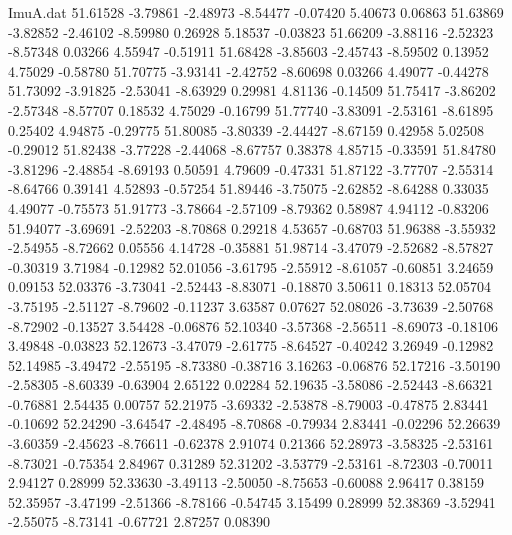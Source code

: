 \begin{filecontents}{ImuA.dat}
  51.61528   -3.79861   -2.48973   -8.54477   -0.07420    5.40673    0.06863
  51.63869   -3.82852   -2.46102   -8.59980    0.26928    5.18537   -0.03823
  51.66209   -3.88116   -2.52323   -8.57348    0.03266    4.55947   -0.51911
  51.68428   -3.85603   -2.45743   -8.59502    0.13952    4.75029   -0.58780
  51.70775   -3.93141   -2.42752   -8.60698    0.03266    4.49077   -0.44278
  51.73092   -3.91825   -2.53041   -8.63929    0.29981    4.81136   -0.14509
  51.75417   -3.86202   -2.57348   -8.57707    0.18532    4.75029   -0.16799
  51.77740   -3.83091   -2.53161   -8.61895    0.25402    4.94875   -0.29775
  51.80085   -3.80339   -2.44427   -8.67159    0.42958    5.02508   -0.29012
  51.82438   -3.77228   -2.44068   -8.67757    0.38378    4.85715   -0.33591
  51.84780   -3.81296   -2.48854   -8.69193    0.50591    4.79609   -0.47331
  51.87122   -3.77707   -2.55314   -8.64766    0.39141    4.52893   -0.57254
  51.89446   -3.75075   -2.62852   -8.64288    0.33035    4.49077   -0.75573
  51.91773   -3.78664   -2.57109   -8.79362    0.58987    4.94112   -0.83206
  51.94077   -3.69691   -2.52203   -8.70868    0.29218    4.53657   -0.68703
  51.96388   -3.55932   -2.54955   -8.72662    0.05556    4.14728   -0.35881
  51.98714   -3.47079   -2.52682   -8.57827   -0.30319    3.71984   -0.12982
  52.01056   -3.61795   -2.55912   -8.61057   -0.60851    3.24659    0.09153
  52.03376   -3.73041   -2.52443   -8.83071   -0.18870    3.50611    0.18313
  52.05704   -3.75195   -2.51127   -8.79602   -0.11237    3.63587    0.07627
  52.08026   -3.73639   -2.50768   -8.72902   -0.13527    3.54428   -0.06876
  52.10340   -3.57368   -2.56511   -8.69073   -0.18106    3.49848   -0.03823
  52.12673   -3.47079   -2.61775   -8.64527   -0.40242    3.26949   -0.12982
  52.14985   -3.49472   -2.55195   -8.73380   -0.38716    3.16263   -0.06876
  52.17216   -3.50190   -2.58305   -8.60339   -0.63904    2.65122    0.02284
  52.19635   -3.58086   -2.52443   -8.66321   -0.76881    2.54435    0.00757
  52.21975   -3.69332   -2.53878   -8.79003   -0.47875    2.83441   -0.10692
  52.24290   -3.64547   -2.48495   -8.70868   -0.79934    2.83441   -0.02296
  52.26639   -3.60359   -2.45623   -8.76611   -0.62378    2.91074    0.21366
  52.28973   -3.58325   -2.53161   -8.73021   -0.75354    2.84967    0.31289
  52.31202   -3.53779   -2.53161   -8.72303   -0.70011    2.94127    0.28999
  52.33630   -3.49113   -2.50050   -8.75653   -0.60088    2.96417    0.38159
  52.35957   -3.47199   -2.51366   -8.78166   -0.54745    3.15499    0.28999
  52.38369   -3.52941   -2.55075   -8.73141   -0.67721    2.87257    0.08390

\end{filecontents}

